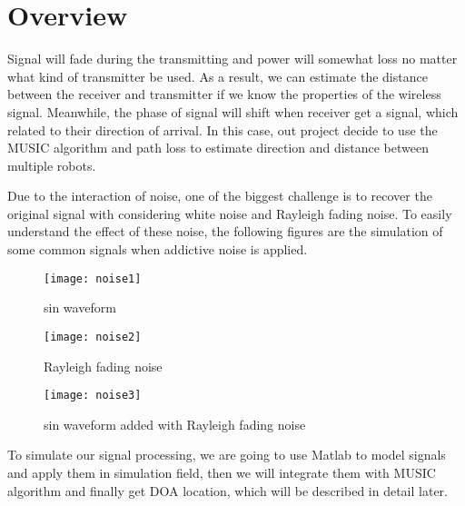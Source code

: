 
\section{Overview}
\label{sec:overview}
	Signal will fade during the transmitting and power will somewhat loss no matter what kind of transmitter be used. As a result, we can estimate the distance between the receiver and transmitter if we know the properties of the wireless signal. Meanwhile, the phase of signal will shift when receiver get a signal, which related to their direction of arrival. In this case, out project decide to use the MUSIC algorithm and path loss to estimate direction and distance between multiple robots.\\
	\par
	Due to the interaction of noise, one of the biggest challenge is to recover the original signal with considering white noise and Rayleigh fading noise. To easily understand the effect of these noise, the following figures are the simulation of some common signals when addictive noise is applied.\\
	\begin{figure}[h]
	
	\begin{minipage}[t]{0.9\linewidth}
	\centering
	\texttt{[image: noise1]}
	\caption{sin waveform}
	\end{minipage}
	
	\begin{minipage}[t]{0.9\linewidth}
	\centering
	\texttt{[image: noise2]}
	\caption{Rayleigh fading noise}
	\end{minipage}

	\begin{minipage}[t]{0.9\linewidth}
	\centering
	\texttt{[image: noise3]}
	\caption{sin waveform added with Rayleigh fading noise}
	\end{minipage}

	\end{figure}
	
	\par
	To simulate our signal processing, we are going to use Matlab to model signals and apply them in simulation field, then we will integrate them with MUSIC algorithm and finally get DOA location, which will be described in detail later. 


